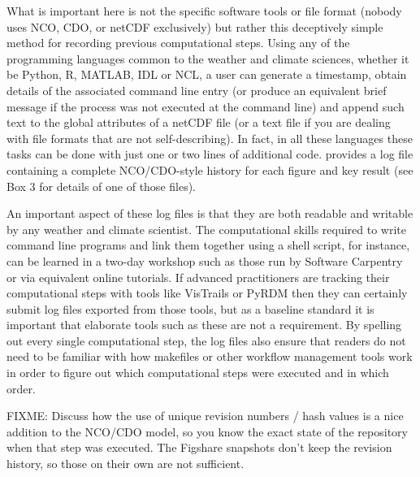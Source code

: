 What is important here is not the specific software tools or file format (nobody uses NCO, CDO, or netCDF exclusively) but rather this deceptively simple method for recording previous computational steps. Using any of the programming languages common to the weather and climate sciences, whether it be Python, R, MATLAB, IDL or NCL, a user can generate a timestamp, obtain details of the associated command line entry (or produce an equivalent brief message if the process was not executed at the command line) and append such text to the global attributes of a netCDF file (or a text file if you are dealing with file formats that are not self-describing). In fact, in all these languages these tasks can be done with just one or two lines of additional code. \citet{Irving2015} provides a log file containing a complete NCO/CDO-style history for each figure and key result (see Box 3 for details of one of those files).

An important aspect of these log files is that they are both readable and writable by any weather and climate scientist. The computational skills required to write command line programs and link them together using a shell script, for instance, can be learned in a two-day workshop such as those run by Software Carpentry \citep{Wilson2014} or via equivalent online tutorials. If advanced practitioners are tracking their computational steps with tools like VisTrails or PyRDM then they can certainly submit log files exported from those tools, but as a baseline standard it is important that elaborate tools such as these are not a requirement. By spelling out every single computational step, the log files also ensure that readers do not need to be familiar with how makefiles or other workflow management tools work in order to figure out which computational steps were executed and in which order.  

FIXME: Discuss how the use of unique revision numbers / hash values is a nice addition to the NCO/CDO model, so you know the exact state of the repository when that step was executed. The Figshare snapshots don't keep the revision history, so those on their own are not sufficient. 
